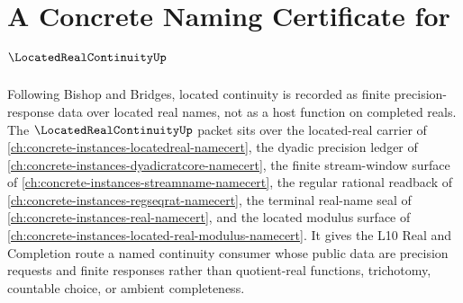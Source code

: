 \chapter{A Concrete Naming Certificate for $\LocatedRealContinuityUp$}
\label{ch:concrete-instances-located-real-continuity-namecert}

Following Bishop and Bridges, located continuity is recorded as finite precision-response data over located real names, not as a host function on completed reals. The $\LocatedRealContinuityUp$ packet sits over the located-real carrier of \autoref{ch:concrete-instances-locatedreal-namecert}, the dyadic precision ledger of \autoref{ch:concrete-instances-dyadicratcore-namecert}, the finite stream-window surface of \autoref{ch:concrete-instances-streamname-namecert}, the regular rational readback of \autoref{ch:concrete-instances-regseqrat-namecert}, the terminal real-name seal of \autoref{ch:concrete-instances-real-namecert}, and the located modulus surface of \autoref{ch:concrete-instances-located-real-modulus-namecert}. It gives the L10 Real and Completion route a named continuity consumer whose public data are precision requests and finite responses rather than quotient-real functions, trichotomy, countable choice, or ambient completeness.

